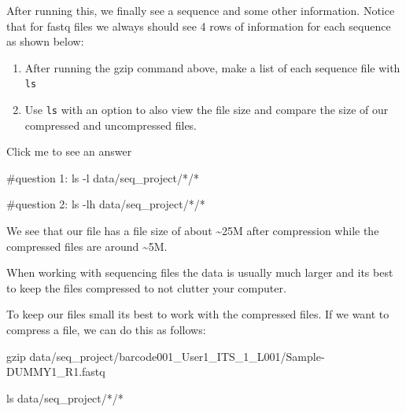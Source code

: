 \documentclass[
  letterpaper,
  DIV=11,
  numbers=noendperiod]{scrreprt}
\newenvironment{Shaded}{}{}
\newcommand{\AttributeTok}[1]{\textcolor[rgb]{0.84,0.23,0.29}{#1}}
\newcommand{\CommentTok}[1]{\textcolor[rgb]{0.42,0.45,0.49}{#1}}
\newcommand{\FunctionTok}[1]{\textcolor[rgb]{0.44,0.26,0.76}{#1}}
\newcommand{\NormalTok}[1]{\textcolor[rgb]{0.14,0.16,0.18}{#1}}
\newcommand{\PreprocessorTok}[1]{\textcolor[rgb]{0.84,0.23,0.29}{#1}}
\providecommand{\tightlist}{%
  \setlength{\itemsep}{0pt}\setlength{\parskip}{0pt}}\usepackage{longtable,booktabs,array}
\begin{document}
After running this, we finally see a sequence and some other
information. Notice that for fastq files we always should see 4 rows of
information for each sequence as shown below:

\begin{tcolorbox}[enhanced jigsaw, title=\textcolor{quarto-callout-caution-color}{\faFire}\hspace{0.5em}{Exercise}, colframe=quarto-callout-caution-color-frame, opacitybacktitle=0.6, rightrule=.15mm, arc=.35mm, left=2mm, colbacktitle=quarto-callout-caution-color!10!white, bottomrule=.15mm, leftrule=.75mm, toprule=.15mm, opacityback=0, bottomtitle=1mm, colback=white, toptitle=1mm, breakable, titlerule=0mm, coltitle=black]

\begin{enumerate}
\def\labelenumi{\arabic{enumi}.}
\tightlist
\item
  After running the gzip command above, make a list of each sequence
  file with \texttt{ls}
\item
  Use \texttt{ls} with an option to also view the file size and compare
  the size of our compressed and uncompressed files.
\end{enumerate}

Click me to see an answer

\begin{Shaded}
\begin{Highlighting}[]
\CommentTok{\#question 1:}
\FunctionTok{ls} \AttributeTok{{-}l}\NormalTok{ data/seq\_project/}\PreprocessorTok{*}\NormalTok{/}\PreprocessorTok{*}

\CommentTok{\#question 2:}
\FunctionTok{ls} \AttributeTok{{-}lh}\NormalTok{ data/seq\_project/}\PreprocessorTok{*}\NormalTok{/}\PreprocessorTok{*}
\end{Highlighting}
\end{Shaded}

We see that our file has a file size of about \textasciitilde25M after
compression while the compressed files are around \textasciitilde5M.

When working with sequencing files the data is usually much larger and
its best to keep the files compressed to not clutter your computer.

\end{tcolorbox}

To keep our files small its best to work with the compressed files. If
we want to compress a file, we can do this as follows:

\begin{Shaded}
\begin{Highlighting}[]
\FunctionTok{gzip}\NormalTok{ data/seq\_project/barcode001\_User1\_ITS\_1\_L001/Sample{-}DUMMY1\_R1.fastq}

\FunctionTok{ls}\NormalTok{ data/seq\_project/}\PreprocessorTok{*}\NormalTok{/}\PreprocessorTok{*}
\end{Highlighting}
\end{Shaded}
\end{document}
